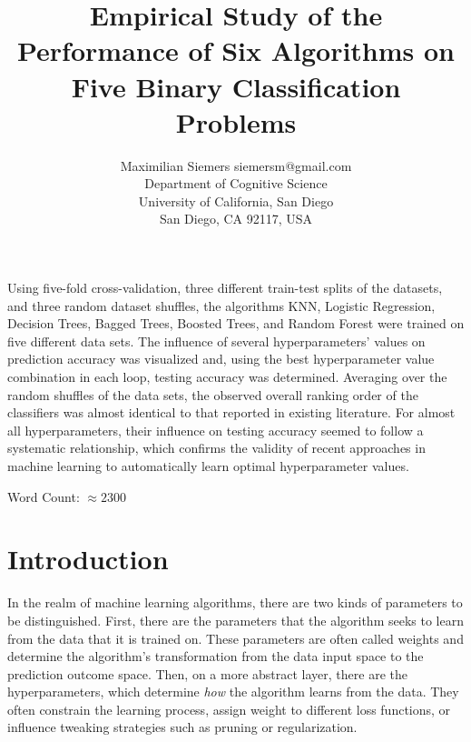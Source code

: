 \documentclass[twoside,11pt]{article}
\begin{document}
	
	\title{Empirical Study of the Performance of Six Algorithms on Five Binary Classification Problems}
	
	\author{\name Maximilian Siemers \email siemersm@gmail.com \\
		\addr Department of Cognitive Science\\
		University of California, San Diego\\
		San Diego, CA 92117, USA}
	
	
	\maketitle
	
	\begin{abstract}%
		
	\end{abstract}
		Using five-fold cross-validation, three different train-test splits of the datasets, and three random dataset shuffles, the algorithms KNN, Logistic Regression, Decision Trees, Bagged Trees, Boosted Trees, and Random Forest were trained on five different data sets. The influence of several hyperparameters' values on prediction accuracy was visualized and, using the best hyperparameter value combination in each loop, testing accuracy was determined. Averaging over the random shuffles of the data sets, the observed overall ranking order of the classifiers was almost identical to that reported in existing literature. For almost all hyperparameters, their influence on testing accuracy seemed to follow a systematic relationship, which confirms the validity of recent approaches in machine learning to automatically learn optimal hyperparameter values.
	
	Word Count: $\approx 2300$
	
	\section{Introduction}
		In the realm of machine learning algorithms, there are two kinds of parameters to be distinguished. First, there are the parameters that the algorithm seeks to learn from the data that it is trained on. These parameters are often called weights and determine the algorithm's transformation from the data input space to the prediction outcome space. Then, on a more abstract layer, there are the hyperparameters, which determine \textit{how} the algorithm learns from the data. They often constrain the learning process, assign weight to different loss functions, or influence tweaking strategies such as pruning or regularization.
		
\end{document}
